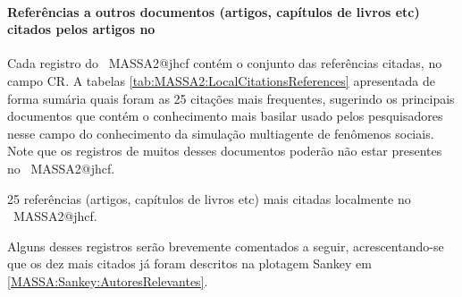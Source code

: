 \paragraph{Referências a outros documentos (artigos, capítulos de livros etc) citados pelos artigos no \dataset}

Cada registro do \dataset\ MASSA2@jhcf contém o conjunto das referências citadas, no campo CR. A tabelas \ref{tab:MASSA2:LocalCitationsReferences} apresentada de forma sumária quais foram as 25 citações mais frequentes, sugerindo os principais documentos que contém o conhecimento mais basilar usado pelos pesquisadores nesse campo do conhecimento da simulação multiagente de fenômenos sociais. Note que os registros de muitos desses documentos poderão não estar presentes no \dataset\ MASSA2@jhcf.

\begin{table}[htp]
    \centering
\footnotesize
{}

    \caption{25 referências (artigos, capítulos de livros etc) mais citadas localmente no \dataset\ MASSA2@jhcf.}
    \label{tab:MASSA2:LocalCitationsReferences}
\end{table}

Alguns desses registros serão brevemente comentados a seguir, acrescentando-se que os dez mais citados já foram descritos na plotagem Sankey em \ref{MASSA:Sankey:AutoresRelevantes}.

